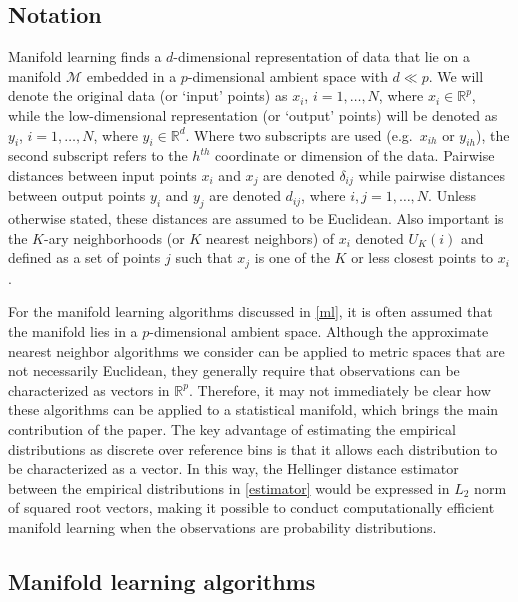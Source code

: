 \documentclass{article}
\begin{document}
\hypertarget{notation}{%
\subsection{Notation}\label{notation}}

Manifold learning finds a \(d\)-dimensional representation of data that
lie on a manifold \(\mathcal{M}\) embedded in a \(p\)-dimensional
ambient space with \(d \ll p\). We will denote the original data (or
`input' points) as \(x_i\), \(i=1,\dots,N\), where
\(x_i\in\mathbb{R}^p\), while the low-dimensional representation (or
`output' points) will be denoted as \(y_i\), \(i=1,\dots,N\), where
\(y_i\in\mathbb{R}^d\). Where two subscripts are used (e.g.~\(x_{ih}\)
or \(y_{ih}\)), the second subscript refers to the \(h^{th}\) coordinate
or dimension of the data. Pairwise distances between input points
\(x_i\) and \(x_j\) are denoted \(\delta_{ij}\) while pairwise distances
between output points \(y_i\) and \(y_j\) are denoted \(d_{ij}\), where
\(i,j=1,\dots,N\). Unless otherwise stated, these distances are assumed
to be Euclidean. Also important is the \(K\)-ary neighborhoods (or \(K\)
nearest neighbors) of \(x_i\) denoted \(U_K(i)\) and defined as a set of
points \(j\) such that \(x_j\) is one of the \(K\) or less closest
points to \(x_i\).

For the manifold learning algorithms discussed in \autoref{ml}, it is
often assumed that the manifold lies in a \(p\)-dimensional ambient
space. Although the approximate nearest neighbor algorithms we consider
can be applied to metric spaces that are not necessarily Euclidean, they
generally require that observations can be characterized as vectors in
\(\mathbb{R}^p\). Therefore, it may not immediately be clear how these
algorithms can be applied to a statistical manifold, which brings the
main contribution of the paper. The key advantage of estimating the
empirical distributions as discrete over reference bins is that it
allows each distribution to be characterized as a vector. In this way,
the Hellinger distance estimator between the empirical distributions in
\autoref{estimator} would be expressed in \(L_2\) norm of squared root
vectors, making it possible to conduct computationally efficient
manifold learning when the observations are probability distributions.

\hypertarget{ml}{%
\subsection{Manifold learning algorithms}\label{ml}}
\end{document}
